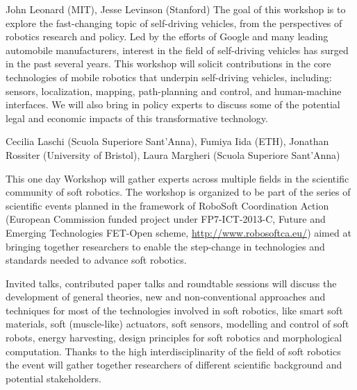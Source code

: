 \begin{spacing}{1.0}
{John Leonard (MIT), Jesse Levinson (Stanford)}
{
The goal of this workshop is to explore the fast-changing topic of self-driving vehicles, from the perspectives of robotics research and policy.  Led by the efforts of Google and many leading automobile manufacturers, interest in the field of self-driving vehicles has surged in the past several years.  This workshop will solicit contributions in the core technologies of mobile robotics that underpin self-driving vehicles, including: sensors, localization, mapping, path-planning and control, and human-machine interfaces.  We will also bring in policy experts  to discuss some of the potential legal and economic impacts of this transformative technology.
}


{Cecilia Laschi (Scuola Superiore Sant'Anna), Fumiya Iida (ETH), Jonathan Rossiter (University of Bristol), Laura Margheri (Scuola Superiore Sant'Anna)}
{
This one day Workshop will gather experts across multiple fields in the scientific community of soft robotics. The workshop is organized to be part of the series of scientific events planned in the framework of RoboSoft Coordination Action (European Commission funded project under FP7-ICT-2013-C, Future and Emerging Technologies FET-Open scheme, \url{http://www.robosoftca.eu/}) aimed at bringing together researchers to enable the step-change in technologies and standards needed to advance soft robotics.

Invited talks, contributed paper talks and roundtable sessions will discuss the development of general theories, new and non-conventional approaches and techniques for most of the technologies involved in soft robotics, like smart soft materials, soft (muscle-like) actuators, soft sensors, modelling and control of soft robots, energy harvesting, design principles for soft robotics and morphological computation. Thanks to the high interdisciplinarity of the field of soft robotics the event will gather together researchers of different scientific background and potential stakeholders.
}


\end{spacing}
